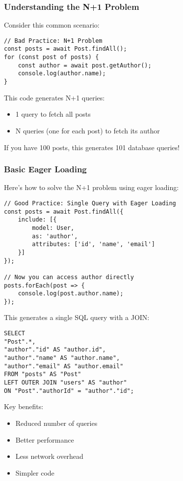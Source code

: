 \documentclass[12pt,a4paper]{book}
\begin{document}
	\subsubsection{Understanding the N+1 Problem}
	\begin{tcolorbox}[title=The N+1 Query Problem]
		Consider this common scenario:
		
		\begin{verbatim}
// Bad Practice: N+1 Problem
const posts = await Post.findAll();
for (const post of posts) {
	const author = await post.getAuthor();
	console.log(author.name);
}
		\end{verbatim}
		
		This code generates N+1 queries:
		\begin{itemize}
			\item 1 query to fetch all posts
			\item N queries (one for each post) to fetch its author
		\end{itemize}
		
		If you have 100 posts, this generates 101 database queries!
	\end{tcolorbox}
	
	\subsubsection{Basic Eager Loading}
	
		Here's how to solve the N+1 problem using eager loading:
		
		\begin{verbatim}
// Good Practice: Single Query with Eager Loading
const posts = await Post.findAll({
	include: [{
		model: User,
		as: 'author',
		attributes: ['id', 'name', 'email']
	}]
});

// Now you can access author directly
posts.forEach(post => {
	console.log(post.author.name);
});
		\end{verbatim}
		
		This generates a single SQL query with a JOIN:
		\begin{verbatim}
SELECT 
"Post".*,
"author"."id" AS "author.id",
"author"."name" AS "author.name",
"author"."email" AS "author.email"
FROM "posts" AS "Post"
LEFT OUTER JOIN "users" AS "author" 
ON "Post"."authorId" = "author"."id";
		\end{verbatim}
		
		Key benefits:
		\begin{itemize}
			\item Reduced number of queries
			\item Better performance
			\item Less network overhead
			\item Simpler code
		\end{itemize}
	
\end{document}
